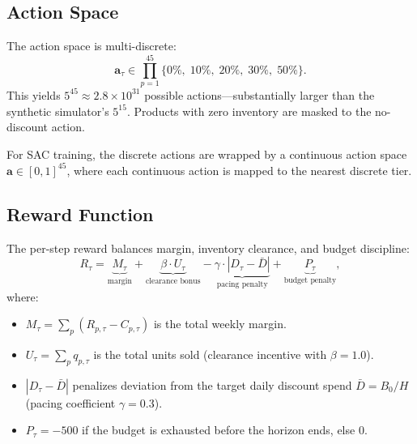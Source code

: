 \documentclass[11pt,a4paper]{article}
\begin{document}
\subsection{Action Space}

The action space is multi-discrete:
\begin{equation}
\mathbf{a}_\tau \in \prod_{p=1}^{45}\{0\%,\;10\%,\;20\%,\;30\%,\;50\%\}.
\end{equation}
This yields $5^{45} \approx 2.8 \times 10^{31}$ possible actions---substantially larger than the synthetic simulator's $5^{15}$.
Products with zero inventory are masked to the no-discount action.

For SAC training, the discrete actions are wrapped by a continuous action space $\mathbf{a} \in [0,1]^{45}$, where each continuous action is mapped to the nearest discrete tier.

\subsection{Reward Function}

The per-step reward balances margin, inventory clearance, and budget discipline:
\begin{equation}
R_\tau = \underbrace{M_\tau}_{\text{margin}} + \underbrace{\beta \cdot U_\tau}_{\text{clearance bonus}} - \underbrace{\gamma \cdot |D_\tau - \bar{D}|}_{\text{pacing penalty}} + \underbrace{P_\tau}_{\text{budget penalty}},
\end{equation}
where:
\begin{itemize}
    \item $M_\tau = \sum_p (R_{p,\tau} - C_{p,\tau})$ is the total weekly margin.
    \item $U_\tau = \sum_p q_{p,\tau}$ is the total units sold (clearance incentive with $\beta = 1.0$).
    \item $|D_\tau - \bar{D}|$ penalizes deviation from the target daily discount spend $\bar{D} = B_0 / H$ (pacing coefficient $\gamma = 0.3$).
    \item $P_\tau = -500$ if the budget is exhausted before the horizon ends, else 0.
\end{itemize}
\end{document}
